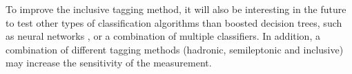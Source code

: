To improve the inclusive tagging method, it will also be interesting in the future to test other types of classification algorithms than boosted decision trees, such as neural networks \cite{hastie01statisticallearning}, or a combination of multiple classifiers.
In addition, a combination of different tagging methods (hadronic, semileptonic and inclusive) may increase the sensitivity of the measurement.
